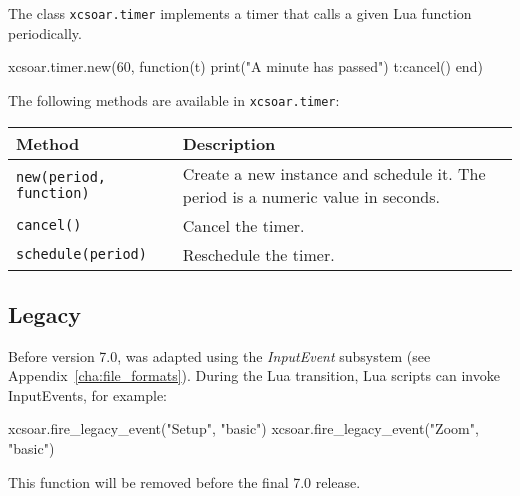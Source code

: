 The class \verb|xcsoar.timer| implements a timer that calls a given
Lua function periodically.

\begin{lua}
xcsoar.timer.new(60, function(t)
  print("A minute has passed")
  t:cancel()
end)
\end{lua}

The following methods are available in \verb|xcsoar.timer|:

\begin{maxipage}
\begin{tabular}{l|p{10cm}}
Method & Description \\
\hline\hline

\verb|new(period, function)| & Create a new instance and schedule
it.  The period is a numeric value in seconds. \\

\hline

\verb|cancel()| & Cancel the timer. \\

\hline

\verb|schedule(period)| & Reschedule the timer. \\

\end{tabular}
\end{maxipage}

\subsection{Legacy}

Before version 7.0, \xc was adapted using the \emph{InputEvent}
subsystem (see Appendix~\ref{cha:file_formats}).  During the Lua
transition, Lua scripts can invoke InputEvents, for example:

\begin{lua}
xcsoar.fire_legacy_event("Setup", "basic")
xcsoar.fire_legacy_event("Zoom", "basic")
\end{lua}

This function will be removed before the final 7.0 release.
